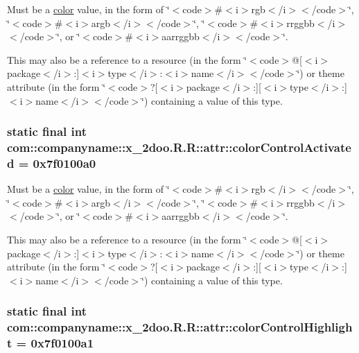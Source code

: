 Must be a \hyperlink{classcom_1_1companyname_1_1x__2doo_1_1_r_1_1color}{color} value, in the form of \char`\"{}$<$code$>$\#$<$i$>$rgb$<$/i$>$$<$/code$>$\char`\"{}, \char`\"{}$<$code$>$\#$<$i$>$argb$<$/i$>$$<$/code$>$\char`\"{}, \char`\"{}$<$code$>$\#$<$i$>$rrggbb$<$/i$>$$<$/code$>$\char`\"{}, or \char`\"{}$<$code$>$\#$<$i$>$aarrggbb$<$/i$>$$<$/code$>$\char`\"{}. 

This may also be a reference to a resource (in the form \char`\"{}$<$code$>$@\mbox{[}$<$i$>$package$<$/i$>$:\mbox{]}$<$i$>$type$<$/i$>$:$<$i$>$name$<$/i$>$$<$/code$>$\char`\"{}) or theme attribute (in the form \char`\"{}$<$code$>$?\mbox{[}$<$i$>$package$<$/i$>$:\mbox{]}\mbox{[}$<$i$>$type$<$/i$>$:\mbox{]}$<$i$>$name$<$/i$>$$<$/code$>$\char`\"{}) containing a value of this type. \hypertarget{classcom_1_1companyname_1_1x__2doo_1_1_r_1_1attr_1c1afce4db901572b107eca98353455c}{
\subsubsection[{colorControlActivated}]{\setlength{\rightskip}{0pt plus 5cm}static final int com::companyname::x\_\-2doo.R.R::attr::colorControlActivated = 0x7f0100a0}}
\label{classcom_1_1companyname_1_1x__2doo_1_1_r_1_1attr_1c1afce4db901572b107eca98353455c}


Must be a \hyperlink{classcom_1_1companyname_1_1x__2doo_1_1_r_1_1color}{color} value, in the form of \char`\"{}$<$code$>$\#$<$i$>$rgb$<$/i$>$$<$/code$>$\char`\"{}, \char`\"{}$<$code$>$\#$<$i$>$argb$<$/i$>$$<$/code$>$\char`\"{}, \char`\"{}$<$code$>$\#$<$i$>$rrggbb$<$/i$>$$<$/code$>$\char`\"{}, or \char`\"{}$<$code$>$\#$<$i$>$aarrggbb$<$/i$>$$<$/code$>$\char`\"{}. 

This may also be a reference to a resource (in the form \char`\"{}$<$code$>$@\mbox{[}$<$i$>$package$<$/i$>$:\mbox{]}$<$i$>$type$<$/i$>$:$<$i$>$name$<$/i$>$$<$/code$>$\char`\"{}) or theme attribute (in the form \char`\"{}$<$code$>$?\mbox{[}$<$i$>$package$<$/i$>$:\mbox{]}\mbox{[}$<$i$>$type$<$/i$>$:\mbox{]}$<$i$>$name$<$/i$>$$<$/code$>$\char`\"{}) containing a value of this type. \hypertarget{classcom_1_1companyname_1_1x__2doo_1_1_r_1_1attr_1e64bb96b5191150557a2d6b4d8dba2b}{
\subsubsection[{colorControlHighlight}]{\setlength{\rightskip}{0pt plus 5cm}static final int com::companyname::x\_\-2doo.R.R::attr::colorControlHighlight = 0x7f0100a1}}
\label{classcom_1_1companyname_1_1x__2doo_1_1_r_1_1attr_1e64bb96b5191150557a2d6b4d8dba2b}


